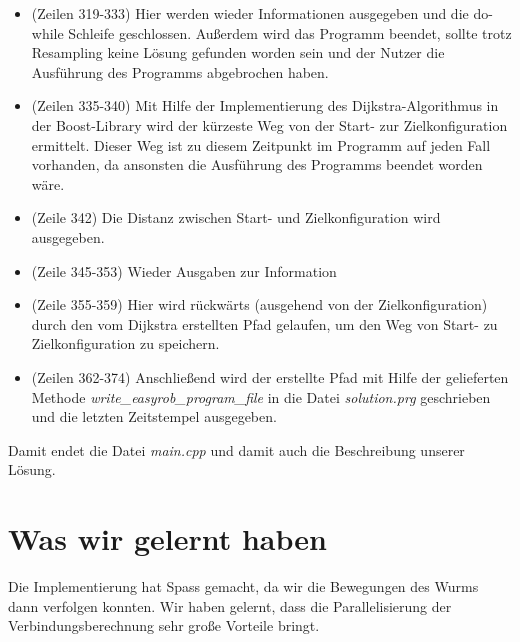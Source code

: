 \documentclass[a4paper]{scrartcl}
\begin{document}
\begin{itemize}
\begin{itemize}
		\item (Zeilen 319-333) Hier werden wieder Informationen ausgegeben und die do-while Schleife geschlossen. Außerdem wird das Programm beendet, sollte trotz Resampling keine Lösung gefunden worden sein und der Nutzer die Ausführung des Programms abgebrochen haben.
		\item (Zeilen 335-340) Mit Hilfe der Implementierung des Dijkstra-Algorithmus in der Boost-Library wird der kürzeste Weg von der Start- zur Zielkonfiguration ermittelt. Dieser Weg ist zu diesem Zeitpunkt im Programm auf jeden Fall vorhanden, da ansonsten die Ausführung des Programms beendet worden wäre.
		\item (Zeile 342) Die Distanz zwischen Start- und Zielkonfiguration wird ausgegeben.
		\item (Zeile 345-353) Wieder Ausgaben zur Information
		\item (Zeile 355-359) Hier wird rückwärts (ausgehend von der Zielkonfiguration) durch den vom Dijkstra erstellten Pfad gelaufen, um den Weg von Start- zu Zielkonfiguration zu speichern.
		\item (Zeilen 362-374) Anschließend wird der erstellte Pfad mit Hilfe der gelieferten Methode \textit{write\_easyrob\_program\_file} in die Datei \textit{solution.prg} geschrieben und die letzten Zeitstempel ausgegeben.
	\end{itemize} 
\end{itemize}
	Damit endet die Datei \textit{main.cpp} und damit auch die Beschreibung unserer Lösung.
	
\section*{Was wir gelernt haben}

Die Implementierung hat Spass gemacht, da wir die Bewegungen des Wurms dann verfolgen konnten. Wir haben gelernt, dass die Parallelisierung der Verbindungsberechnung sehr große Vorteile bringt.
\end{document}
